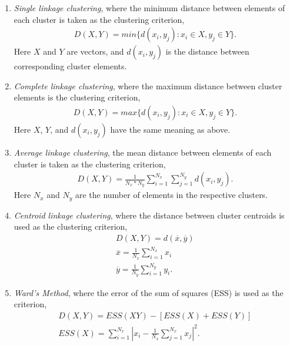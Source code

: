 \begin{enumerate}
\item{ \textit{Single linkage  clustering}, where the minimum distance
  between elements of each cluster is taken as the clustering criterion,
\begin{gather}
D(X, Y)=min\{d(x_i, y_j): x_i \in X, y_j \in Y \}.
\end{gather}
Here  $X$ and  $Y$ are  vectors, and  $d(x_i, y_j)$  is  the distance
between corresponding cluster elements.}

\item{  \textit{Complete   linkage  clustering},  where   the  maximum
  distance between cluster elements is the clustering criterion,
\begin{gather}
D(X, Y)=max\{d(x_i, y_j): x_i \in X, y_j \in Y \}.
\end{gather} }
Here $X$, $Y$, and $d(x_{i},y_{j})$ have the same meaning as above.
  
\item{ \textit{Average linkage  clustering}, the mean distance between
  elements of each cluster is taken as the clustering criterion,
\begin{gather}
D(X, Y)=\frac{1}{N_x  * N_y} \sum_{i=1}^{N_x}  \sum_{j=1}^{N_y} d(x_i,
y_j).
\end{gather}
Here $N_x$ and $N_y$ are the number of elements in the respective
clusters.  }

\item{ \textit{Centroid linkage clustering}, where the distance between
  cluster centroids is used as the clustering criterion,
\begin{gather}
D(X, Y)=d(\overline{x}, \overline{y})\\
\overline{x} = \frac{1}{N_x} \sum_{i=1}^{N_x} x_i\\
\overline{y} = \frac{1}{N_y} \sum_{i=1}^{N_y} y_i.
\end{gather} }

\item{ \textit{Ward's Method},  where the error of the  sum of squares
  (ESS) is used as the criterion,
\begin{gather}
D(X,Y)=ESS(XY) -[ESS(X) + ESS(Y)]\\
ESS(X)=  \sum_{i=1}^{N_x} \left|
x_i -\frac{1}{N_x}\sum_{j=1}^{N_x} x_j\right|^2 .
\end{gather} }
\end{enumerate}

